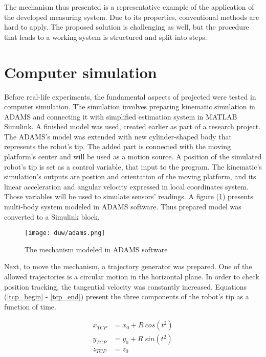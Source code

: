 The mechanism thus presented is a representative example of the application of the developed measuring system. Due to its properties, conventional methods are hard to apply. The proposed solution is challenging as well, but the procedure that leads to a working system is structured and split into steps. 

\section{Computer simulation}

Before real-life experiments, the fundamental aspects of projected were tested in computer simulation. The simulation involves preparing kinematic simulation in ADAMS and connecting it with simplified estimation system in MATLAB Simulink. A finished model was used, created earlier as part of a research project. The ADAMS's model was extended with new cylinder-shaped body that represents the robot's tip. The added part is connected with the moving platform's center and will be used as a motion source. A position of the simulated robot's tip is set as a control variable, that input to the program. The kinematic's simulation's outputs are postion and orientation of the moving platform, and its linear acceleration and angular velocity expressed in local coordinates system. Those variables will be used to simulate sensors' readings.
A figure (\ref{adams}) presents multi-body system modeled in ADAMS software. Thus prepared model was converted to a Simulink block. 

\begin{figure}[!h]
	\centering
	\texttt{[image: duw/adams.png]}
	\caption{The mechanism modeled in ADAMS software}
	\label{adams}
\end{figure}

Next, to move the mechanism, a trajectory generator was prepared. One of the allowed trajectories is a circular motion in the horizontal plane. In order to check position tracking, the tangential velocity was constantly increased. Equations (\ref{tcp_begin} - \ref{tcp_end}) present the three components of the robot's tip as a function of time.

\begin{align}
	x_{TCP} &= x_0 +  R\ cos( t^2 )
	\label{tcp_begin}\\
	y_{TCP} &= y_0  + R\ sin( t^2 )\\
	z_{TCP} &= z_0
	\label{tcp_end}
\end{align}

